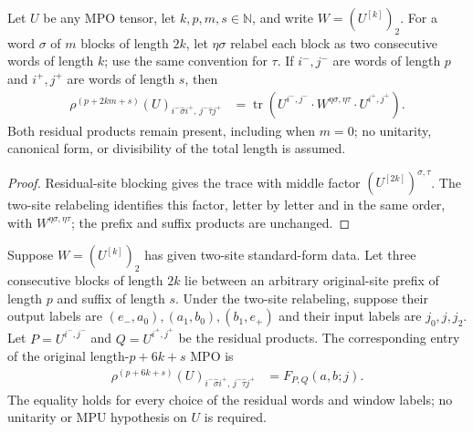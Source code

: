 \begin{lemma}
    \label{lem:mpu_original_site_residual_two_site_word}
    \leanok
    Let $U$ be any MPO tensor, let $k,p,m,s\in\mathbb N$, and write
    $W=(U^{[k]})_2$. For a word $\sigma$ of $m$ blocks of length $2k$,
    let $\eta\sigma$ relabel each block as two consecutive words of length
    $k$; use the same convention for $\tau$. If $i^-,j^-$ are words of
    length $p$ and $i^+,j^+$ are words of length $s$, then
    \begin{align}
        \rho^{(p+2km+s)}(U)_{i^-\widehat\sigma i^+,\,
            j^-\widehat\tau j^+}
         & =\operatorname{tr}\!\left(
        U^{i^-,j^-}\cdot W^{\eta\sigma,\eta\tau}
        \cdot U^{i^+,j^+}\right).
    \end{align}
    Both residual products remain present, including when $m=0$; no
    unitarity, canonical form, or divisibility of the total length is
    assumed.
\end{lemma}

\begin{proof}\leanok
    Residual-site blocking gives the trace with middle factor
    $(U^{[2k]})^{\sigma,\tau}$. The two-site relabeling identifies this
    factor, letter by letter and in the same order, with
    $W^{\eta\sigma,\eta\tau}$; the prefix and suffix products are unchanged.
\end{proof}

\begin{lemma}
    \label{thm:mpu_original_site_three_block_window_entry}
    \leanok
    Suppose $W=(U^{[k]})_2$ has given two-site standard-form data.
    Let three consecutive blocks of length $2k$ lie between an arbitrary
    original-site prefix of length $p$ and suffix of length $s$. Under the
    two-site relabeling, suppose their output labels are
    $(e_-,a_0),(a_1,b_0),(b_1,e_+)$ and their input labels are
    $j_0,j,j_2$. Let $P=U^{i^-,j^-}$ and $Q=U^{i^+,j^+}$ be the residual
    products. The corresponding entry of the original length-$p+6k+s$
    MPO is
    \begin{align}
        \rho^{(p+6k+s)}(U)_{i^-\widehat\sigma i^+,\,
            j^-\widehat\tau j^+}
         & = F_{P,Q}(a,b;j).
    \end{align}
    The equality holds for every choice of the residual words and window
    labels; no unitarity or MPU hypothesis on $U$ is required.
\end{lemma}

